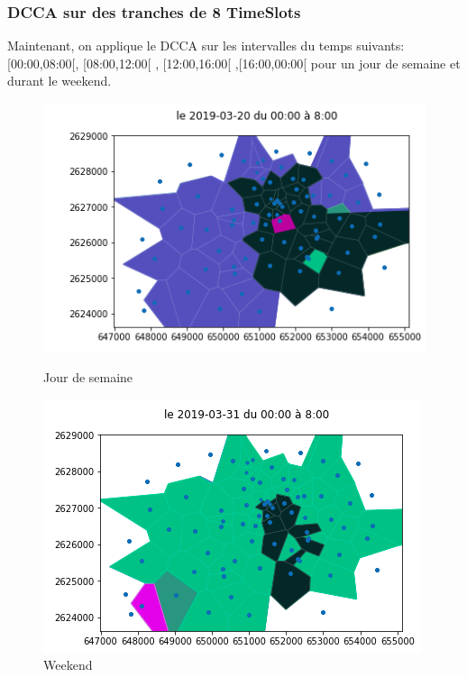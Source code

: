 \documentclass{report}
\begin{document}
\subsubsection{DCCA sur des tranches de 8 TimeSlots}
Maintenant, on applique le DCCA sur les intervalles du temps suivants: [00:00,08:00[, [08:00,12:00[ , [12:00,16:00[ ,[16:00,00:00[ 
pour un jour de semaine et durant le weekend. \\
\begin{figure}[H]
  \begin{minipage}{0.4\textwidth}
    \centering
    \includegraphics[scale=0.55]{images/S00_8.png}
    \caption{Jour de semaine}\label{Fig:Data1}
  \end{minipage}\hfill
  \begin{minipage}{0.4\textwidth}
    \centering
    \includegraphics[scale=0.55]{images/W00_8.png}
    \caption{Weekend}\label{Fig:Data2}
  \end{minipage}
\end{figure} 
\end{document}
